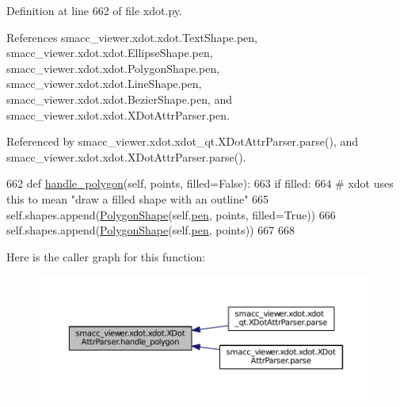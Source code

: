Definition at line 662 of file xdot.\+py.



References smacc\+\_\+viewer.\+xdot.\+xdot.\+Text\+Shape.\+pen, smacc\+\_\+viewer.\+xdot.\+xdot.\+Ellipse\+Shape.\+pen, smacc\+\_\+viewer.\+xdot.\+xdot.\+Polygon\+Shape.\+pen, smacc\+\_\+viewer.\+xdot.\+xdot.\+Line\+Shape.\+pen, smacc\+\_\+viewer.\+xdot.\+xdot.\+Bezier\+Shape.\+pen, and smacc\+\_\+viewer.\+xdot.\+xdot.\+X\+Dot\+Attr\+Parser.\+pen.



Referenced by smacc\+\_\+viewer.\+xdot.\+xdot\+\_\+qt.\+X\+Dot\+Attr\+Parser.\+parse(), and smacc\+\_\+viewer.\+xdot.\+xdot.\+X\+Dot\+Attr\+Parser.\+parse().


\begin{DoxyCode}
662     \textcolor{keyword}{def }\hyperlink{classsmacc__viewer_1_1xdot_1_1xdot_1_1XDotAttrParser_a52d83c9c11f45a1587ef9a7942435615}{handle\_polygon}(self, points, filled=False):
663         \textcolor{keywordflow}{if} filled:
664             \textcolor{comment}{# xdot uses this to mean "draw a filled shape with an outline"}
665             self.shapes.append(\hyperlink{classsmacc__viewer_1_1xdot_1_1xdot_1_1PolygonShape}{PolygonShape}(self.\hyperlink{classsmacc__viewer_1_1xdot_1_1xdot_1_1XDotAttrParser_aae80bcd7ba2a33502b1148b1bf4e2130}{pen}, points, filled=\textcolor{keyword}{True}))
666         self.shapes.append(\hyperlink{classsmacc__viewer_1_1xdot_1_1xdot_1_1PolygonShape}{PolygonShape}(self.\hyperlink{classsmacc__viewer_1_1xdot_1_1xdot_1_1XDotAttrParser_aae80bcd7ba2a33502b1148b1bf4e2130}{pen}, points))
667 
668 
\end{DoxyCode}


Here is the caller graph for this function\+:
\nopagebreak
\begin{figure}[H]
\begin{center}
\leavevmode
\includegraphics[width=350pt]{classsmacc__viewer_1_1xdot_1_1xdot_1_1XDotAttrParser_a52d83c9c11f45a1587ef9a7942435615_icgraph}
\end{center}
\end{figure}


